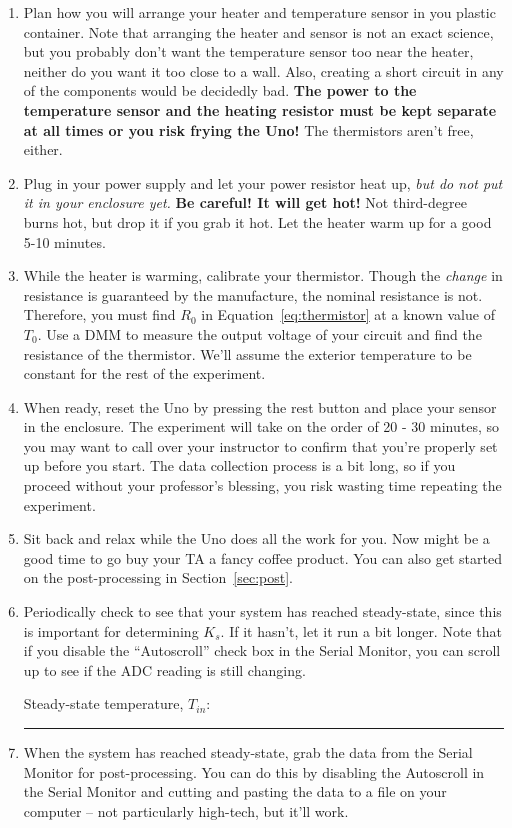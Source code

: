 \documentclass[11pt]{article} %
\begin{document}
\begin{enumerate}
\item Plan how you will arrange your heater and temperature sensor in you plastic container. Note that arranging the heater and sensor is not an exact science, but you probably don't want the temperature sensor too near the heater, neither do you want it too close to a wall. Also, creating a short circuit in any of the components would be decidedly bad. {\bf The power to the temperature sensor and the heating resistor must be kept separate at all times or you risk frying the Uno!} The thermistors aren't free, either.
\item Plug in your power supply and let your power resistor heat up, \emph{but do not put it in your enclosure yet.} {\bf Be careful! It will get hot!} Not third-degree burns hot, but drop it if you grab it hot. Let the heater warm up for a good 5-10 minutes.
\item While the heater is warming, calibrate your thermistor. Though the \emph{change} in resistance is guaranteed by the manufacture, the nominal resistance is not. Therefore, you must find $R_0$ in Equation~\ref{eq:thermistor} at a known value of $T_0$. Use a DMM to measure the output voltage of your circuit and find the resistance of the thermistor. We'll assume the exterior temperature to be constant for the rest of the experiment.
\item When ready, reset the Uno by pressing the rest button and place your sensor in the enclosure. The experiment will take on the order of 20 - 30 minutes, so you may want to call over your instructor to confirm that you're properly set up before you start. The data collection process is a bit long, so if you proceed without your professor's blessing, you risk wasting time repeating the experiment.
\item Sit back and relax while the Uno does all the work for you. Now might be a good time to go buy your TA a fancy coffee product. You can also get started on the post-processing in Section~\ref{sec:post}.
\item Periodically check to see that your system has reached steady-state, since this is important for determining $K_s$. If it hasn't, let it run a bit longer. Note that if you disable the “Autoscroll” check box in the Serial Monitor, you can scroll up to see if the ADC reading is still changing.

\vspace{0.25in}
Steady-state temperature, $T_{in}$: \rule{2in}{0.4pt}
\vspace{0.25in}
\item When the system has reached steady-state, grab the data from the Serial Monitor for post-processing. You can do this by disabling the Autoscroll in the Serial Monitor and cutting and pasting the data to a file on your computer -- not particularly high-tech, but it’ll work.
\end{enumerate}
\end{document}
